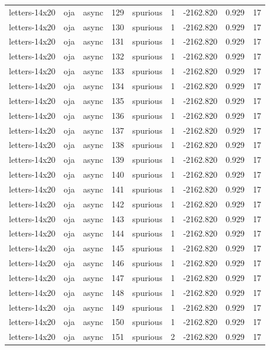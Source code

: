 \begin{tabular}{lllrlrrrr}
letters-14x20 & oja & async & 129 & spurious & 1 & -2162.820 & 0.929 & 17 \\
letters-14x20 & oja & async & 130 & spurious & 1 & -2162.820 & 0.929 & 17 \\
letters-14x20 & oja & async & 131 & spurious & 1 & -2162.820 & 0.929 & 17 \\
letters-14x20 & oja & async & 132 & spurious & 1 & -2162.820 & 0.929 & 17 \\
letters-14x20 & oja & async & 133 & spurious & 1 & -2162.820 & 0.929 & 17 \\
letters-14x20 & oja & async & 134 & spurious & 1 & -2162.820 & 0.929 & 17 \\
letters-14x20 & oja & async & 135 & spurious & 1 & -2162.820 & 0.929 & 17 \\
letters-14x20 & oja & async & 136 & spurious & 1 & -2162.820 & 0.929 & 17 \\
letters-14x20 & oja & async & 137 & spurious & 1 & -2162.820 & 0.929 & 17 \\
letters-14x20 & oja & async & 138 & spurious & 1 & -2162.820 & 0.929 & 17 \\
letters-14x20 & oja & async & 139 & spurious & 1 & -2162.820 & 0.929 & 17 \\
letters-14x20 & oja & async & 140 & spurious & 1 & -2162.820 & 0.929 & 17 \\
letters-14x20 & oja & async & 141 & spurious & 1 & -2162.820 & 0.929 & 17 \\
letters-14x20 & oja & async & 142 & spurious & 1 & -2162.820 & 0.929 & 17 \\
letters-14x20 & oja & async & 143 & spurious & 1 & -2162.820 & 0.929 & 17 \\
letters-14x20 & oja & async & 144 & spurious & 1 & -2162.820 & 0.929 & 17 \\
letters-14x20 & oja & async & 145 & spurious & 1 & -2162.820 & 0.929 & 17 \\
letters-14x20 & oja & async & 146 & spurious & 1 & -2162.820 & 0.929 & 17 \\
letters-14x20 & oja & async & 147 & spurious & 1 & -2162.820 & 0.929 & 17 \\
letters-14x20 & oja & async & 148 & spurious & 1 & -2162.820 & 0.929 & 17 \\
letters-14x20 & oja & async & 149 & spurious & 1 & -2162.820 & 0.929 & 17 \\
letters-14x20 & oja & async & 150 & spurious & 1 & -2162.820 & 0.929 & 17 \\
letters-14x20 & oja & async & 151 & spurious & 2 & -2162.820 & 0.929 & 17 \\

\end{tabular}
